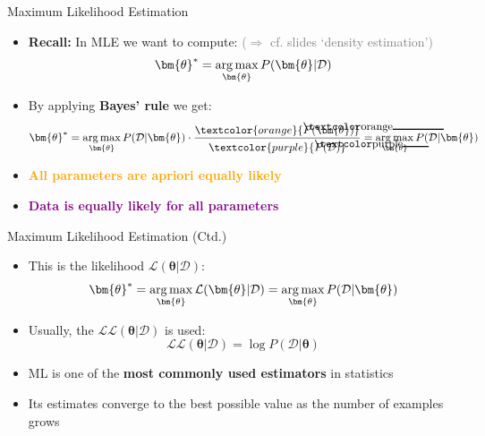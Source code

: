 \begin{frame}{Maximum Likelihood Estimation}{}
	\begin{itemize}
		\item \textbf{Recall:} In MLE we want to compute: \textcolor{gray}{($\Rightarrow$ cf. slides `density estimation')}
		\begin{equation*}
			\bm{\theta}^* = \argmax_{\bm{\theta}} P(\bm{\theta} \vert \mathcal{D})
		\end{equation*}
		\item By applying \textbf{Bayes' rule} we get:
		\begin{equation*}
			\bm{\theta}^* = \argmax_{\bm{\theta}} P(\mathcal{D} \vert \bm{\theta})
				\cdot \frac{
					\textcolor{orange}{\hcancel[orange]{P(\bm{\theta})}}
				}{
					\textcolor{purple}{\hcancel[purple]{P(\mathcal{D})}}
				} = \argmax_{\bm{\theta}} P(\mathcal{D} \vert \bm{\theta})
		\end{equation*}
		\item \textcolor{orange}{\textbf{All parameters are apriori equally likely}}
		\item \textcolor{purple}{\textbf{Data is equally likely for all parameters}}
	\end{itemize}
\end{frame}


\begin{frame}{Maximum Likelihood Estimation (Ctd.)}{}
	\begin{itemize}
		\item This is the likelihood $\mathcal{L}(\bm{\theta} \vert \mathcal{D})$:
		\begin{equation*}
			\bm{\theta}^* = \argmax_{\bm{\theta}} \mathcal{L}(\bm{\theta} \vert \mathcal{D}) =
				\argmax_{\bm{\theta}} P(\mathcal{D} \vert \bm{\theta})
		\end{equation*}
		\item Usually, the  $\mathcal{L}\mathcal{L}(\bm{\theta} \vert \mathcal{D})$ is used:
		\begin{equation*}
			\mathcal{L}\mathcal{L}(\bm{\theta} \vert \mathcal{D}) = \log P(\mathcal{D} \vert \bm{\theta})
		\end{equation*}
		\item ML is one of the \textbf{most commonly used estimators} in statistics
		\item Its estimates converge to the best possible value as the number of examples grows
	\end{itemize}
\end{frame}


